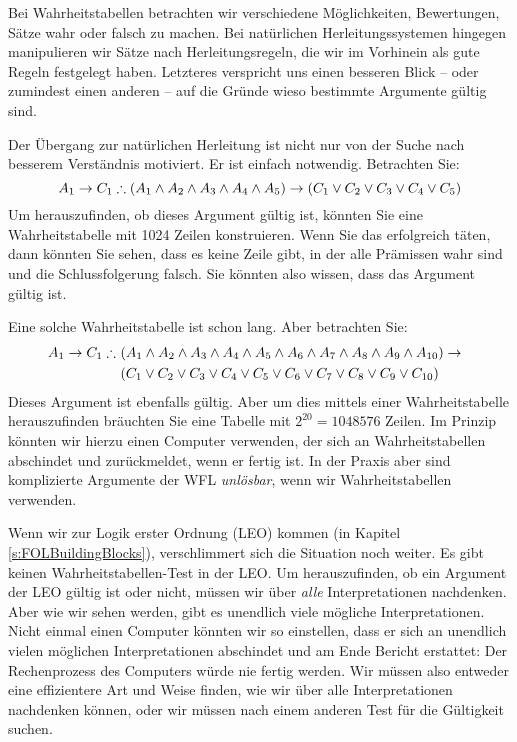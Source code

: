 Bei Wahrheitstabellen betrachten wir verschiedene Möglichkeiten, Bewertungen, Sätze wahr oder falsch zu machen. Bei natürlichen Herleitungssystemen hingegen manipulieren wir Sätze nach Herleitungsregeln, die wir im Vorhinein als gute Regeln festgelegt haben. Letzteres verspricht uns einen besseren Blick -- oder zumindest einen anderen -- auf die Gründe wieso bestimmte Argumente gültig sind.

Der Übergang zur natürlichen Herleitung ist nicht nur von der Suche nach besserem Verständnis motiviert. Er ist einfach notwendig. Betrachten Sie:
$$A_1 \eif C_1 \therefore (A_1 \eand A_2 \eand A_3 \eand A_4 \eand A_5) \eif (C_1 \eor C_2 \eor C_3 \eor C_4 \eor C_5)$$
Um herauszufinden, ob dieses Argument gültig ist, könnten Sie eine Wahrheitstabelle mit 1024 Zeilen konstruieren. Wenn Sie das erfolgreich täten, dann könnten Sie sehen, dass es keine Zeile gibt, in der alle Prämissen wahr sind und die Schlussfolgerung falsch. Sie könnten also wissen, dass das Argument gültig ist.

Eine solche Wahrheitstabelle ist schon lang. Aber betrachten Sie:
\begin{align*}
A_1 \eif C_1 \therefore\ & (A_1 \eand A_2 \eand A_3 \eand A_4 \eand A_5 \eand A_6 \eand A_7 \eand A_8 \eand A_9 \eand A_{10}) \eif \phantom{(}\\
&(C_1 \eor C_2 \eor C_3 \eor C_4 \eor C_5 \eor C_6 \eor C_7 \eor C_8 \eor C_9 \eor C_{10})
\end{align*}
Dieses Argument ist ebenfalls gültig. Aber um dies mittels einer Wahrheitstabelle herauszufinden bräuchten Sie eine Tabelle mit $2^{20} = 1048576$ Zeilen. Im Prinzip könnten wir hierzu einen Computer verwenden, der sich an Wahrheitstabellen abschindet und zurückmeldet, wenn er fertig ist. In der Praxis aber sind komplizierte Argumente der WFL \emph{unlösbar}, wenn wir Wahrheitstabellen verwenden.

Wenn wir zur Logik erster Ordnung (LEO) kommen (in Kapitel \ref{s:FOLBuildingBlocks}), verschlimmert sich die Situation noch weiter. Es gibt keinen Wahrheitstabellen-Test in der LEO. Um herauszufinden, ob ein Argument der LEO gültig ist oder nicht, müssen wir über \emph{alle} Interpretationen nachdenken. Aber wie wir sehen werden, gibt es unendlich viele mögliche Interpretationen. Nicht einmal einen Computer könnten wir so einstellen, dass er sich an unendlich vielen möglichen Interpretationen abschindet und am Ende Bericht erstattet: Der Rechenprozess des Computers würde nie fertig werden. Wir müssen also entweder eine effizientere Art und Weise finden, wie wir über alle Interpretationen nachdenken können, oder wir müssen nach einem anderen Test für die Gültigkeit suchen. 

